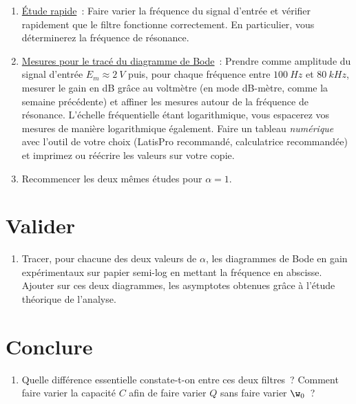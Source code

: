 \documentclass[a4paper, 11pt, final, garamond]{book}
\begin{document}
\begin{enumerate}[label=\sqenumi, resume]
    \item \underline{Étude rapide}~: Faire varier la fréquence du signal
        d'entrée et vérifier rapidement que le filtre fonctionne correctement.
        En particulier, vous déterminerez la fréquence de résonance.
    \item \underline{Mesures pour le tracé du diagramme de Bode}~: Prendre comme
        amplitude du signal d'entrée $E_{m} \approx \SI{2}{V}$ puis, pour chaque
        fréquence entre $\SI{100}{Hz}$ et $\SI{80}{kHz}$, mesurer le gain en dB
        grâce au voltmètre (en mode dB-mètre, comme la semaine précédente) et
        affiner les mesures autour de la fréquence de résonance. L'échelle
        fréquentielle étant logarithmique, vous espacerez vos mesures de manière
        logarithmique également. Faire un tableau \textit{numérique} avec
        l'outil de votre choix (LatisPro recommandé, calculatrice recommandée)
        et imprimez ou réécrire les valeurs sur votre copie.
    \item Recommencer les deux mêmes études pour $\alpha=1$.
\end{enumerate}

\section{Valider}

\begin{enumerate}[label=\sqenumi, resume]
    \item Tracer, pour chacune des deux valeurs de $\alpha$, les diagrammes de
        Bode en gain expérimentaux sur papier semi-log en mettant la fréquence
        en abscisse. Ajouter sur ces deux diagrammes, les asymptotes obtenues
        grâce à l'étude théorique de l'analyse.
\end{enumerate}

\section{Conclure}

\begin{enumerate}[label=\sqenumi, resume]
    \item Quelle différence essentielle constate-t-on entre ces deux filtres~?
        Comment faire varier la capacité $C$ afin de faire varier $Q$ sans faire
        varier $\w_0$~? 
\end{enumerate}

\newpage

\thispagestyle{empty}


\newpage

\thispagestyle{empty}

\end{document}

